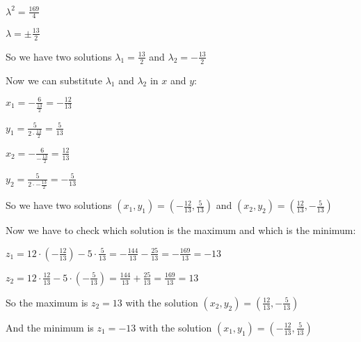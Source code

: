 \singlespacing

$\lambda^2 = \frac{169}{4}$

\singlespacing

$\lambda = \pm \frac{13}{2}$

\singlespacing

So we have two solutions $\lambda_1 = \frac{13}{2}$ and $\lambda_2 = -\frac{13}{2}$

\singlespacing

Now we can substitute $\lambda_1$ and $\lambda_2$ in $x$ and $y$:

\singlespacing

$x_1 = -\frac{6}{\frac{13}{2}} = -\frac{12}{13}$

\singlespacing

$y_1 = \frac{5}{2\cdot \frac{13}{2}} = \frac{5}{13}$

\singlespacing

$x_2 = -\frac{6}{-\frac{13}{2}} = \frac{12}{13}$

\singlespacing

$y_2 = \frac{5}{2\cdot -\frac{13}{2}} = -\frac{5}{13}$

\singlespacing

So we have two solutions $(x_1, y_1) = \left(-\frac{12}{13}, \frac{5}{13}\right)$ and $(x_2, y_2) = \left(\frac{12}{13}, -\frac{5}{13}\right)$

\singlespacing

Now we have to check which solution is the maximum and which is the minimum:

\singlespacing

$z_1 = 12\cdot \left(-\frac{12}{13}\right) - 5\cdot \frac{5}{13} = -\frac{144}{13} - \frac{25}{13} = -\frac{169}{13} = -13$

\singlespacing

$z_2 = 12\cdot \frac{12}{13} - 5\cdot \left(-\frac{5}{13}\right) = \frac{144}{13} + \frac{25}{13} = \frac{169}{13} = 13$

\singlespacing

So the maximum is $z_2 = 13$ with the solution $(x_2, y_2) = \left(\frac{12}{13}, -\frac{5}{13}\right)$

\singlespacing

And the minimum is $z_1 = -13$ with the solution $(x_1, y_1) = \left(-\frac{12}{13}, \frac{5}{13}\right)$